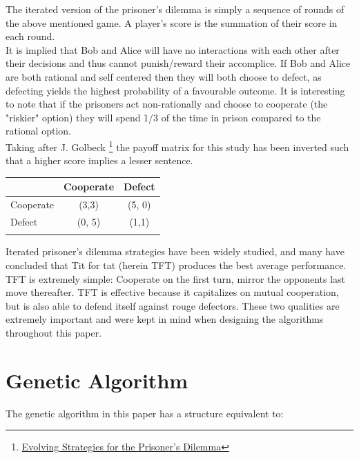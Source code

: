 \documentclass[12pt]{article}
\begin{document}
The iterated version of the prisoner's dilemma is simply a sequence of rounds of
the above mentioned game.  A player's score is the summation of their score in
each round. \\

It is implied that Bob and Alice will have no interactions with each other after
their decisions and thus cannot punish/reward their accomplice. If Bob and Alice are
both rational and self centered then they will both choose to defect, as defecting
yields the highest probability of a favourable outcome.  It is interesting to note
that if the prisoners act non-rationally and choose to cooperate
(the "riskier" option) they will spend 1/3 of the time in prison compared
to the rational option. \\

Taking after J. Golbeck
\footnote{\href{http://cgis.cs.umd.edu/~golbeck/downloads/JGolbeck\_prison.pdf}
{Evolving Strategies for the Prisoner's Dilemma}}
the payoff matrix for this study has been
inverted such that a higher score implies a lesser sentence. \\

\begin{center}
    \begin{tabular}{l | c | c}
         & Cooperate & Defect \\
        \hline
        Cooperate & (3,3) & (5, 0)\\
        \hline
        Defect & (0, 5) & (1,1) \\ \\
    \end{tabular}
\end{center}

Iterated prisoner's dilemma strategies have been widely studied, and many have
concluded that Tit for tat (herein TFT) produces the best average performance.
TFT is extremely simple: Cooperate on the first turn, mirror the opponents
last move thereafter.  TFT is effective because it capitalizes on mutual
cooperation, but is also able to defend itself against rouge defectors.  These
two qualities are extremely important and were kept in mind when designing the
algorithms throughout this paper.
\section{Genetic Algorithm}

The genetic algorithm in this paper has a structure equivalent to: \\
\end{document}
